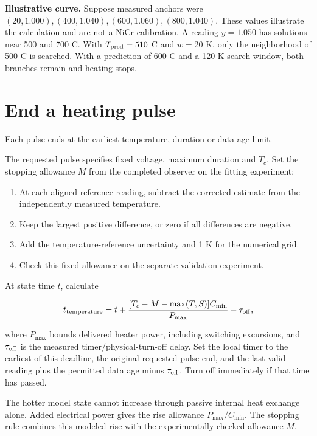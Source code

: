 \documentclass[11pt,letterpaper]{article}
\begin{document}
\textbf{Illustrative curve.} Suppose measured anchors were \((20,1.000),(400,1.040),(600,1.060),(800,1.040)\). These values illustrate the calculation and are not a NiCr calibration. A reading \(y=1.050\) has solutions near 500 and 700 \textdegree{}C. With \(T_{\rm pred}=510\) \textdegree{}C and \(w=20\) K, only the neighborhood of 500 \textdegree{}C is searched. With a prediction of 600 \textdegree{}C and a 120 K search window, both branches remain and heating stops.

\section{End a heating pulse}

Each pulse ends at the earliest temperature, duration or data-age limit.

The requested pulse specifies fixed voltage, maximum duration and \(T_c\). Set the stopping allowance \(M\) from the completed observer on the fitting experiment:

\begin{enumerate}[start=1]
\item At each aligned reference reading, subtract the corrected estimate from the independently measured temperature.
\item Keep the largest positive difference, or zero if all differences are negative.
\item Add the temperature-reference uncertainty and 1 K for the numerical grid.
\item Check this fixed allowance on the separate validation experiment.
\end{enumerate}

At state time \(t\), calculate

\[
t_{\rm temperature}=t+
\frac{[T_c-M-\max(T,S)]C_{\min}}{P_{\max}}-\tau_{\rm off},
\]

where \(P_{\max}\) bounds delivered heater power, including switching excursions, and \(\tau_{\rm off}\) is the measured timer/physical-turn-off delay. Set the local timer to the earliest of this deadline, the original requested pulse end, and the last valid reading plus the permitted data age minus \(\tau_{\rm off}\). Turn off immediately if that time has passed.

The hotter model state cannot increase through passive internal heat exchange alone. Added electrical power gives the rise allowance \(P_{\max}/C_{\min}\). The stopping rule combines this modeled rise with the experimentally checked allowance \(M\).
\end{document}
